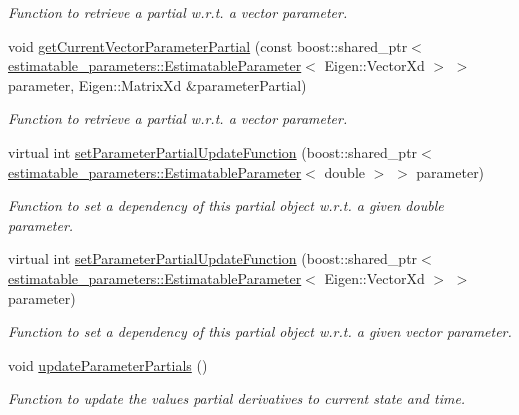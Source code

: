 \begin{DoxyCompactItemize}
\begin{DoxyCompactList}\small\item\em Function to retrieve a partial w.\+r.\+t. a vector parameter. \end{DoxyCompactList}\item 
void \hyperlink{classtudat_1_1orbit__determination_1_1StateDerivativePartial_a9bbf2066f59255975411509507424157}{get\+Current\+Vector\+Parameter\+Partial} (const boost\+::shared\+\_\+ptr$<$ \hyperlink{classtudat_1_1estimatable__parameters_1_1EstimatableParameter}{estimatable\+\_\+parameters\+::\+Estimatable\+Parameter}$<$ Eigen\+::\+Vector\+Xd $>$ $>$ parameter, Eigen\+::\+Matrix\+Xd \&parameter\+Partial)
\begin{DoxyCompactList}\small\item\em Function to retrieve a partial w.\+r.\+t. a vector parameter. \end{DoxyCompactList}\item 
virtual int \hyperlink{classtudat_1_1orbit__determination_1_1StateDerivativePartial_acc9f22ae122c0e3e0869ba236668d592}{set\+Parameter\+Partial\+Update\+Function} (boost\+::shared\+\_\+ptr$<$ \hyperlink{classtudat_1_1estimatable__parameters_1_1EstimatableParameter}{estimatable\+\_\+parameters\+::\+Estimatable\+Parameter}$<$ double $>$ $>$ parameter)
\begin{DoxyCompactList}\small\item\em Function to set a dependency of this partial object w.\+r.\+t. a given double parameter. \end{DoxyCompactList}\item 
virtual int \hyperlink{classtudat_1_1orbit__determination_1_1StateDerivativePartial_a6413aebcc976f94f9b4eeb3acd539cf4}{set\+Parameter\+Partial\+Update\+Function} (boost\+::shared\+\_\+ptr$<$ \hyperlink{classtudat_1_1estimatable__parameters_1_1EstimatableParameter}{estimatable\+\_\+parameters\+::\+Estimatable\+Parameter}$<$ Eigen\+::\+Vector\+Xd $>$ $>$ parameter)
\begin{DoxyCompactList}\small\item\em Function to set a dependency of this partial object w.\+r.\+t. a given vector parameter. \end{DoxyCompactList}\item 
void \hyperlink{classtudat_1_1orbit__determination_1_1StateDerivativePartial_a7a6f8bf919e2a0c16bc254738123b5b4}{update\+Parameter\+Partials} ()
\begin{DoxyCompactList}\small\item\em Function to update the values partial derivatives to current state and time. \end{DoxyCompactList}\end{DoxyCompactItemize}
